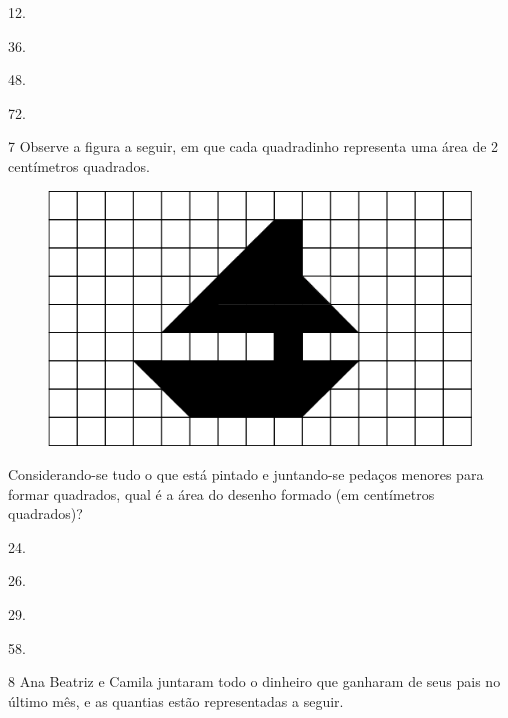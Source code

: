 \begin{multicols}{2}
\begin{escolha}
\item
  12.
\item
  36.
\item
  48.
\item
  72.
\end{escolha}
\end{multicols}

\pagebreak
\num{7} Observe a figura a seguir, em que cada quadradinho representa uma área de 2 centímetros quadrados.

\begin{figure}[htpb!]
\centering
\includegraphics[width=\textwidth]{media/image77.png}
\end{figure}

Considerando-se tudo o que está pintado e juntando-se pedaços
menores para formar quadrados, qual é a área do desenho formado (em centímetros quadrados)?

\begin{escolha}
\item
  24.
\item
  26.
\item
  29.
\item
  58.
\end{escolha}


\num{8} Ana Beatriz e Camila juntaram todo o dinheiro que ganharam de seus pais no
último mês, e as quantias estão representadas a seguir.


